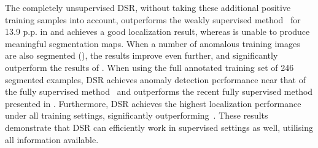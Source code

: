 \documentclass[runningheads]{llncs}
\begin{document}
\begin{table}
\centering
{}
\caption{Anomaly detection () and localization () on the KSDD2 dataset.}
\label{tab:ksdd2}
\end{table}



The completely unsupervised DSR, without taking these additional positive training samples into account, outperforms the weakly supervised method~\cite{bovzivc2021mixed} for 13.9 p.p. in  and achieves a good localization result, whereas \cite{bovzivc2021mixed} is unable to produce meaningful segmentation maps. When a number of anomalous training images are also segmented (), the results improve even further, and significantly outperform the results of \cite{bovzivc2021mixed}. When using the full annotated training set of 246 segmented examples, DSR achieves anomaly detection performance near that of the fully supervised method~\cite{bovzivc2021mixed} and outperforms the recent fully supervised method presented in \cite{leiMachines2021}. Furthermore, DSR achieves the highest localization performance  under all training settings, significantly outperforming~\cite{bovzivc2021mixed}. These results demonstrate that DSR can efficiently work in supervised settings as well, utilising all information available.


\begin{table}[hb]
\centering
{}
\caption{Anomaly detection and localization on the KSDD2 dataset in a supervised settings w.r.t. number of used anomalous training images  with ground truth masks.
}
\label{tab:ksdd2ms}
\end{table}
\end{document}
